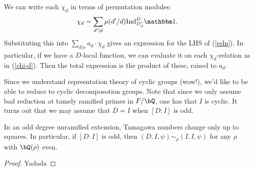 We can write each $\chi_d$ in terms of permutation modules:
\begin{equation}\label{chi-d} \chi_d = \sum_{d' | d} \mu(d' / d)\Ind_{D_d'}^D \trivial .\end{equation}
Substituting this into  $\sum_{d |n} a_d \cdot \chi_d$ gives an expression for the LHS of (\ref{reln}).
In particular, if we have a $D$-local function, we can evaluate it on each $\chi_d$-relation as in (\ref{chi-d}). Then the total expression is the product of these, raised to $a_d$.

Since we understand represntation theory of cyclic groups (wow!), we'd like to be able to reduce to cyclic decomposotion groups. Note that since we only assume bad reduction at tamely ramified primes in $F / \bQ$, one has that $I$ is cyclic. 
It turns out that we may assume that $D = I$ when $[D \colon I]$ is odd. 

\begin{lemma}
    In an odd degree unramified extension, Tamagawa numbers change only up to squares. In particular, if $[D \colon I]$ is odd, then $(D, I, \psi) \sim_{\rho} (I, I, \psi)$ for any $\rho$ with $\bQ(\rho)$ even. 
\end{lemma}

\begin{proof}
    Yadada
\end{proof}